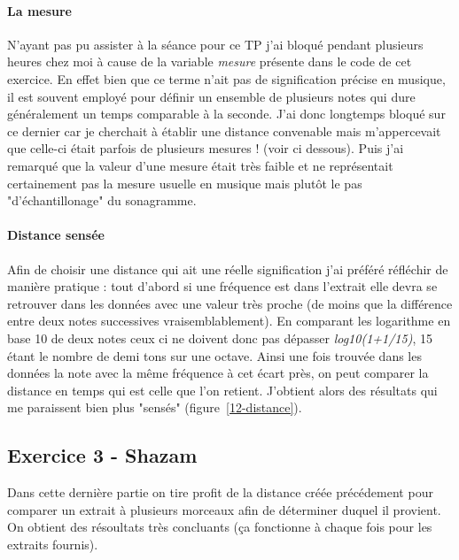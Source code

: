 \documentclass{article}
\begin{document}
\begin{figure}
\end{figure}

\paragraph{La mesure}
N'ayant pas pu assister à la séance pour ce TP j'ai bloqué pendant
plusieurs heures chez moi à cause de la variable \emph{mesure} présente
dans le code de cet exercice. En effet bien que ce terme n'ait pas de
signification précise en musique, il est souvent employé pour définir
un ensemble de plusieurs notes qui dure généralement un temps comparable
à la seconde. J'ai donc longtemps bloqué sur ce dernier car je cherchait
à établir une distance convenable mais m'appercevait que celle-ci était
parfois de plusieurs mesures ! (voir ci dessous). Puis j'ai remarqué
que la valeur d'une mesure était très faible et ne représentait
certainement pas la mesure usuelle en musique mais plutôt le pas
"d'échantillonage" du sonagramme.

\paragraph{Distance sensée}
Afin de choisir une distance qui ait une réelle signification j'ai
préféré réfléchir de manière pratique : tout d'abord si une fréquence est
dans l'extrait elle devra se retrouver dans les données avec une valeur
très proche (de moins que la différence entre deux notes successives
vraisemblablement). En comparant les logarithme en base 10 de deux notes
ceux ci ne doivent donc pas dépasser \emph{log10(1+1/15)}, 15 étant le
nombre de demi tons sur une octave. Ainsi une fois trouvée dans les données
la note avec la même fréquence à cet écart près, on peut comparer la
distance en temps qui est celle que l'on retient. J'obtient alors des
résultats qui me paraissent bien plus "sensés" (figure~\ref{12-distance}).

\begin{figure}
\end{figure}

\subsection{Exercice 3 - Shazam}
Dans cette dernière partie on tire profit de la distance créée précédement
pour comparer un extrait à plusieurs morceaux afin de déterminer duquel
il provient. On obtient des résoultats très concluants (ça fonctionne à
chaque fois pour les extraits fournis).
\end{document}
